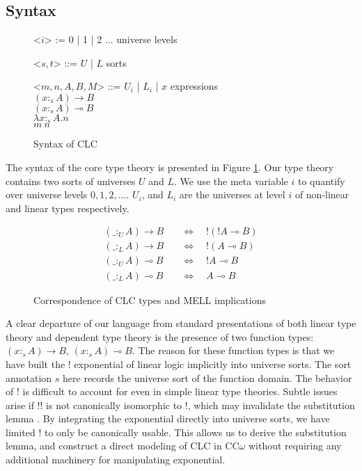 \documentclass[sigplan,screen,review,authordraft]{acmart}
\newcommand{\indalt}[1][2]{\\\hspace*{-1.2em}\textbar\quad}
\newcommand{\utype}{:_{\scriptscriptstyle U}}
\newcommand{\ltype}{:_{\scriptscriptstyle L}}
\begin{document}
\subsection{Syntax}
\begin{figure}[h]
  \caption{Syntax of CLC}
  \begin{grammar}
    <$i$> := 0 | 1 | 2 ... \phantom{* |} \hspace*{3em} universe levels

    <$s, t$> ::= $U$ | $L$ \phantom{| $x$} \hspace*{4.6em} sorts

    <$m, n, A, B, M$> ::= $U_i$ | $L_i$ | $x$ \hspace*{4.2em} expressions
    \indalt $(x :_s A) \rightarrow B$
    \indalt $(x :_s A) \multimap B$
    \indalt $\lambda x :_s A. n$
    \indalt $m\ n$
  \end{grammar}
  \Description{}
  \label{syntax1}
\end{figure}

The syntax of the core type theory is presented in Figure \ref{syntax1}. Our type theory contains two sorts of universes $U$ and $L$. We use the meta variable $i$ to quantify over universe levels $0, 1, 2, ...$. $U_i$, and $L_i$ are the universes at level $i$ of non-linear and linear types respectively.
\begin{figure}[h]
  \caption{Correspondence of CLC types and MELL implications}
  \Description{}
  \begin{align}
    (\_ \utype A) \rightarrow B \quad & \Leftrightarrow \quad !(!A \multimap B) \\
    (\_ \ltype A) \rightarrow B \quad & \Leftrightarrow \quad !(A \multimap B)  \\
    (\_ \utype A) \multimap B \quad   & \Leftrightarrow \quad !A \multimap B    \\
    (\_ \ltype A) \multimap B \quad   & \Leftrightarrow \quad A \multimap B
  \end{align}
  \label{correspondence}
\end{figure}

A clear departure of our language from standard presentations of both linear type theory and dependent type theory is the presence of two function types: $(x :_s A) \rightarrow B$, $(x :_s A) \multimap B$. The reason for these function types is that we have built the ! exponential of linear logic implicitly into universe sorts. The sort annotation $s$ here records the universe sort of the function domain. The behavior of ! is difficult to account for even in simple linear type theories. Subtle issues arise if !! is not canonically isomorphic to !, which may invalidate the substitution lemma \cite{substitute}. By integrating the exponential directly into universe sorts, we have limited ! to only be canonically usable. This allows us to derive the substitution lemma, and construct a direct modeling of CLC in CC$\omega$ without requiring any additional machinery for manipulating exponential.
\end{document}

